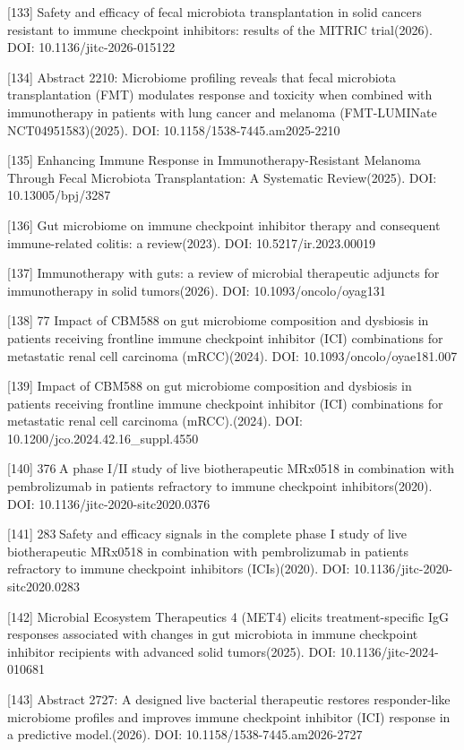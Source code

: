 {[}133{]} Safety and efficacy of fecal microbiota transplantation in solid cancers resistant to immune checkpoint inhibitors: results of the MITRIC trial(2026). DOI: 10.1136/jitc-2026-015122

{[}134{]} Abstract 2210: Microbiome profiling reveals that fecal microbiota transplantation (FMT) modulates response and toxicity when combined with immunotherapy in patients with lung cancer and melanoma (FMT-LUMINate NCT04951583)(2025). DOI: 10.1158/1538-7445.am2025-2210

{[}135{]} Enhancing Immune Response in Immunotherapy-Resistant Melanoma Through Fecal Microbiota Transplantation: A Systematic Review(2025). DOI: 10.13005/bpj/3287

{[}136{]} Gut microbiome on immune checkpoint inhibitor therapy and consequent immune-related colitis: a review(2023). DOI: 10.5217/ir.2023.00019

{[}137{]} Immunotherapy with guts: a review of microbial therapeutic adjuncts for immunotherapy in solid tumors(2026). DOI: 10.1093/oncolo/oyag131

{[}138{]} 77 Impact of CBM588 on gut microbiome composition and dysbiosis in patients receiving frontline immune checkpoint inhibitor (ICI) combinations for metastatic renal cell carcinoma (mRCC)(2024). DOI: 10.1093/oncolo/oyae181.007

{[}139{]} Impact of CBM588 on gut microbiome composition and dysbiosis in patients receiving frontline immune checkpoint inhibitor (ICI) combinations for metastatic renal cell carcinoma (mRCC).(2024). DOI: 10.1200/jco.2024.42.16\_suppl.4550

{[}140{]} 376 A phase I/II study of live biotherapeutic MRx0518 in combination with pembrolizumab in patients refractory to immune checkpoint inhibitors(2020). DOI: 10.1136/jitc-2020-sitc2020.0376

{[}141{]} 283 Safety and efficacy signals in the complete phase I study of live biotherapeutic MRx0518 in combination with pembrolizumab in patients refractory to immune checkpoint inhibitors (ICIs)(2020). DOI: 10.1136/jitc-2020-sitc2020.0283

{[}142{]} Microbial Ecosystem Therapeutics 4 (MET4) elicits treatment-specific IgG responses associated with changes in gut microbiota in immune checkpoint inhibitor recipients with advanced solid tumors(2025). DOI: 10.1136/jitc-2024-010681

{[}143{]} Abstract 2727: A designed live bacterial therapeutic restores responder-like microbiome profiles and improves immune checkpoint inhibitor (ICI) response in a predictive model.(2026). DOI: 10.1158/1538-7445.am2026-2727

